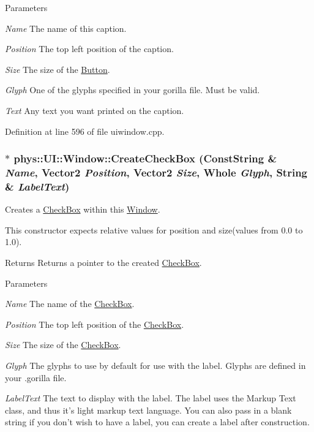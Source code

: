 \begin{DoxyParams}{Parameters}
\item[{\em Name}]The name of this caption. \item[{\em Position}]The top left position of the caption. \item[{\em Size}]The size of the \hyperlink{classphys_1_1UI_1_1Button}{Button}. \item[{\em Glyph}]One of the glyphs specified in your gorilla file. Must be valid. \item[{\em Text}]Any text you want printed on the caption. \end{DoxyParams}


Definition at line 596 of file uiwindow.cpp.

\hypertarget{classphys_1_1UI_1_1Window_a9178c34cd4cd68d18056e7131ae0a77a}{
\subsubsection[{CreateCheckBox}]{ $\ast$ phys::UI::Window::CreateCheckBox ({\bf ConstString} \& {\em Name}, \/  {\bf Vector2} {\em Position}, \/  {\bf Vector2} {\em Size}, \/  {\bf Whole} {\em Glyph}, \/  {\bf String} \& {\em LabelText})}}
\label{d4/d86/classphys_1_1UI_1_1Window_a9178c34cd4cd68d18056e7131ae0a77a}


Creates a \hyperlink{classphys_1_1UI_1_1CheckBox}{CheckBox} within this \hyperlink{classphys_1_1UI_1_1Window}{Window}. 

This constructor expects relative values for position and size(values from 0.0 to 1.0). \begin{DoxyReturn}{Returns}
Returns a pointer to the created \hyperlink{classphys_1_1UI_1_1CheckBox}{CheckBox}. 
\end{DoxyReturn}

\begin{DoxyParams}{Parameters}
\item[{\em Name}]The name of the \hyperlink{classphys_1_1UI_1_1CheckBox}{CheckBox}. \item[{\em Position}]The top left position of the \hyperlink{classphys_1_1UI_1_1CheckBox}{CheckBox}. \item[{\em Size}]The size of the \hyperlink{classphys_1_1UI_1_1CheckBox}{CheckBox}. \item[{\em Glyph}]The glyphs to use by default for use with the label. Glyphs are defined in your .gorilla file. \item[{\em LabelText}]The text to display with the label. The label uses the Markup Text class, and thus it's light markup text language. You can also pass in a blank string if you don't wish to have a label, you can create a label after construction. \end{DoxyParams}


